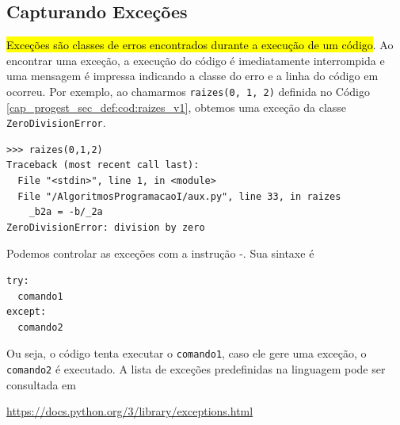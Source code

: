 \subsection{Capturando Exceções}

\hl{Exceções são classes de erros encontrados durante a execução de um código}. Ao encontrar uma exceção, a execução do código {\python} é imediatamente interrompida e uma mensagem é impressa indicando a classe do erro e a linha do código em ocorreu. Por exemplo, ao chamarmos \lstinline+raizes(0, 1, 2)+ definida no Código \ref{cap_progest_sec_def:cod:raizes_v1}, obtemos uma exceção da classe \lstinline+ZeroDivisionError+.

\begin{lstlisting}
>>> raizes(0,1,2)
Traceback (most recent call last):
  File "<stdin>", line 1, in <module>
  File "/AlgoritmosProgramacaoI/aux.py", line 33, in raizes
    _b2a = -b/_2a
ZeroDivisionError: division by zero
\end{lstlisting}

Podemos controlar as exceções com a instrução {\PYTHONtry}-{\PYTHONexcept}. Sua sintaxe é

\begin{lstlisting}
try:
  comando1
except:
  comando2
\end{lstlisting}

Ou seja, o código tenta executar o \lstinline+comando1+, caso ele gere uma exceção, o \lstinline+comando2+ é executado. A lista de exceções predefinidas na linguagem pode ser consultada em
\begin{center}
  \url{https://docs.python.org/3/library/exceptions.html}
\end{center}

